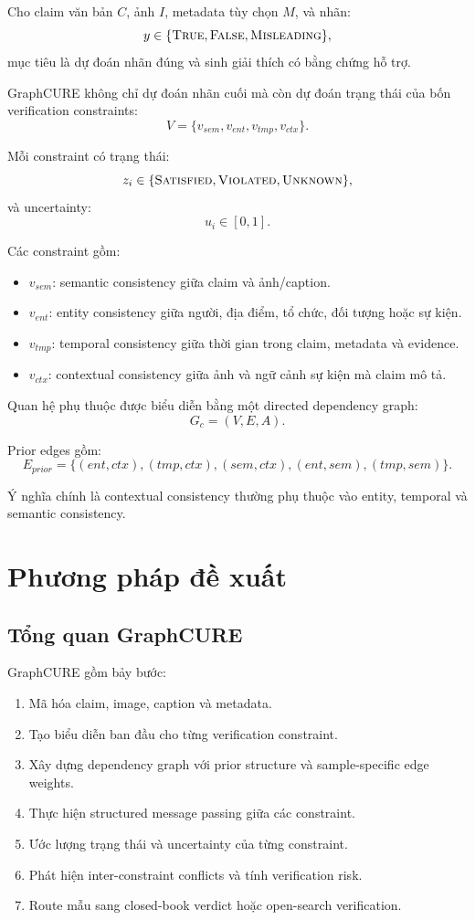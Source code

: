 \documentclass[11pt,a4paper]{article}
\newcommand{\True}{\textsc{True}}
\newcommand{\False}{\textsc{False}}
\newcommand{\Misleading}{\textsc{Misleading}}
\newcommand{\Sat}{\textsc{Satisfied}}
\newcommand{\Viol}{\textsc{Violated}}
\newcommand{\Unk}{\textsc{Unknown}}
\begin{document}
Cho claim văn bản $C$, ảnh $I$, metadata tùy chọn $M$, và nhãn:
\[
y \in \{\True, \False, \Misleading\},
\]
mục tiêu là dự đoán nhãn đúng và sinh giải thích có bằng chứng hỗ trợ.

GraphCURE không chỉ dự đoán nhãn cuối mà còn dự đoán trạng thái của bốn verification constraints:
\[
V = \{v_{sem}, v_{ent}, v_{tmp}, v_{ctx}\}.
\]

Mỗi constraint có trạng thái:
\[
z_i \in \{\Sat,\Viol,\Unk\},
\]
và uncertainty:
\[
u_i \in [0,1].
\]

Các constraint gồm:

\begin{itemize}[leftmargin=1.5em]
\item $v_{sem}$: semantic consistency giữa claim và ảnh/caption.
\item $v_{ent}$: entity consistency giữa người, địa điểm, tổ chức, đối tượng hoặc sự kiện.
\item $v_{tmp}$: temporal consistency giữa thời gian trong claim, metadata và evidence.
\item $v_{ctx}$: contextual consistency giữa ảnh và ngữ cảnh sự kiện mà claim mô tả.
\end{itemize}

Quan hệ phụ thuộc được biểu diễn bằng một directed dependency graph:
\[
G_c = (V,E,A).
\]

Prior edges gồm:
\[
E_{prior} = \{(ent,ctx),(tmp,ctx),(sem,ctx),(ent,sem),(tmp,sem)\}.
\]

Ý nghĩa chính là contextual consistency thường phụ thuộc vào entity, temporal và semantic consistency.

\section{Phương pháp đề xuất}

\subsection{Tổng quan GraphCURE}

GraphCURE gồm bảy bước:

\begin{enumerate}[leftmargin=1.5em]
\item Mã hóa claim, image, caption và metadata.
\item Tạo biểu diễn ban đầu cho từng verification constraint.
\item Xây dựng dependency graph với prior structure và sample-specific edge weights.
\item Thực hiện structured message passing giữa các constraint.
\item Ước lượng trạng thái và uncertainty của từng constraint.
\item Phát hiện inter-constraint conflicts và tính verification risk.
\item Route mẫu sang closed-book verdict hoặc open-search verification.
\end{enumerate}
\end{document}
